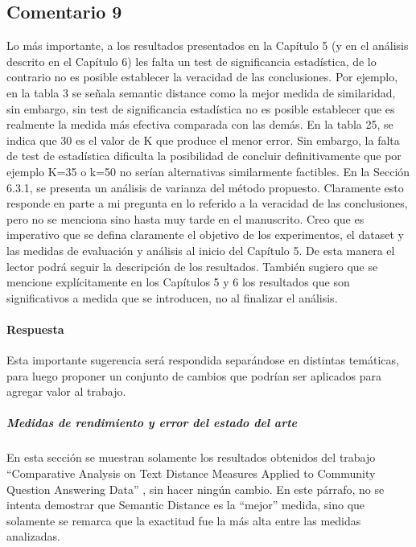 \subsection*{Comentario 9}
Lo más importante, a los resultados presentados en la Capítulo 5 (y en el análisis descrito en el Capítulo 6) les falta un test de significancia estadística, de lo contrario no es posible establecer la veracidad de las conclusiones. Por ejemplo, en la tabla 3 se señala semantic distance como la mejor medida de similaridad, sin embargo, sin test de significancia estadística no es posible establecer que es realmente la medida más efectiva comparada con las demás. En la tabla 25, se indica que 30 es el valor de K que produce el menor error. Sin embargo, la falta de test de estadística dificulta la posibilidad de concluir definitivamente que por ejemplo K=35 o k=50 no serían alternativas similarmente factibles. En la Sección 6.3.1, se presenta un análisis de varianza del método propuesto. Claramente esto responde en parte a mi pregunta en lo referido a la veracidad de las conclusiones, pero no se menciona sino hasta muy tarde en el manuscrito. Creo que es imperativo que se defina claramente el objetivo de los experimentos, el dataset y las medidas de evaluación y análisis al inicio del Capítulo 5. De esta manera el lector podrá seguir la descripción de los resultados. También sugiero que se mencione explícitamente en los Capítulos 5 y 6 los resultados que son significativos a medida que se introducen, no al finalizar el análisis.

\paragraph*{Respuesta}
Esta importante sugerencia será respondida separándose en distintas temáticas, para luego proponer un conjunto de cambios que podrían ser aplicados para agregar valor al trabajo.

\subparagraph{Medidas de rendimiento y error del estado del arte}
En esta sección se muestran solamente los resultados obtenidos del trabajo ``Comparative Analysis on Text Distance Measures Applied to Community Question Answering Data'' \citep{gonzalez2017comparative}, sin hacer ningún cambio. En este párrafo, no se intenta demostrar que Semantic Distance es la ``mejor'' medida, sino que solamente se remarca que la exactitud fue la más alta entre las medidas analizadas.

\bigskip

